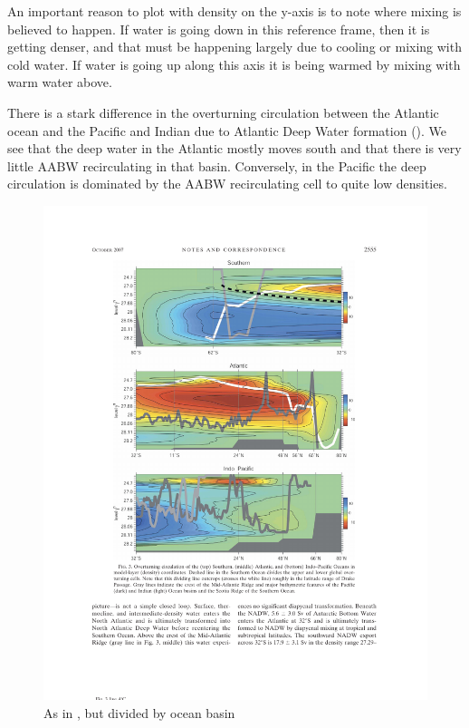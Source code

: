 An important reason to plot  with density on the y-axis is to note where mixing is believed to happen.  If water is going down in this reference frame, then it is getting denser, and that must be happening largely due to cooling or mixing with cold water.  If water is going up along this axis it is being warmed by mixing with warm water above.  

There is a stark difference in the overturning circulation between the Atlantic ocean and the Pacific and Indian due to Atlantic Deep Water formation ().  We see that the deep water in the Atlantic mostly moves south and that there is very little AABW recirculating in that basin.  Conversely, in the Pacific the deep circulation is dominated by the AABW recirculating cell to quite low densities.  


\begin{figure}[hbt]
  \begin{center}
  \includegraphics{figs/WaterMasses/LumpkinSpeer07Fig3}
    \caption{As in , but divided by ocean basin}
    \label{fig:LumpkinSpeer07Fig3}  
  \end{center}
\end{figure}

